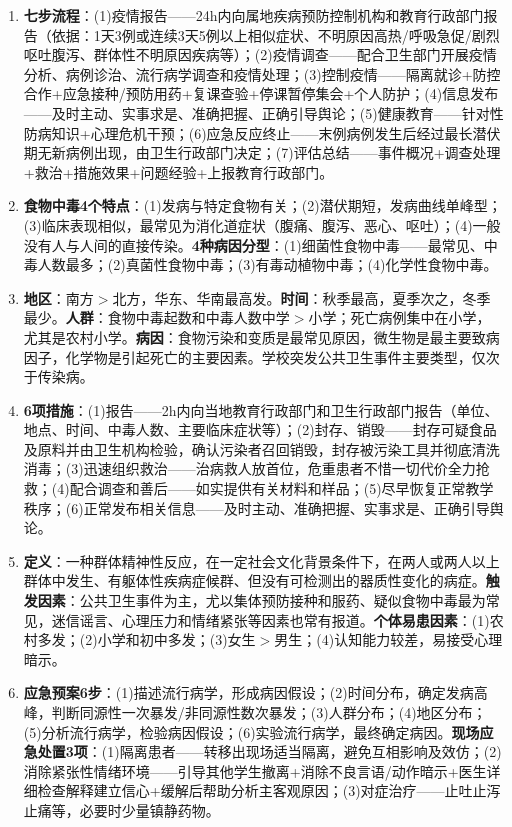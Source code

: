 \begin{enumerate}[leftmargin=*, itemsep=5pt]
    \item \textbf{七步流程}：(1)疫情报告——24h内向属地疾病预防控制机构和教育行政部门报告（依据：1天3例或连续3天5例以上相似症状、不明原因高热/呼吸急促/剧烈呕吐腹泻、群体性不明原因疾病等）；(2)疫情调查——配合卫生部门开展疫情分析、病例诊治、流行病学调查和疫情处理；(3)控制疫情——隔离就诊+防控合作+应急接种/预防用药+复课查验+停课暂停集会+个人防护；(4)信息发布——及时主动、实事求是、准确把握、正确引导舆论；(5)健康教育——针对性防病知识+心理危机干预；(6)应急反应终止——末例病例发生后经过最长潜伏期无新病例出现，由卫生行政部门决定；(7)评估总结——事件概况+调查处理+救治+措施效果+问题经验+上报教育行政部门。

    \item \textbf{食物中毒4个特点}：(1)发病与特定食物有关；(2)潜伏期短，发病曲线单峰型；(3)临床表现相似，最常见为消化道症状（腹痛、腹泻、恶心、呕吐）；(4)一般没有人与人间的直接传染。\textbf{4种病因分型}：(1)细菌性食物中毒——最常见、中毒人数最多；(2)真菌性食物中毒；(3)有毒动植物中毒；(4)化学性食物中毒。

    \item \textbf{地区}：南方$>$北方，华东、华南最高发。\textbf{时间}：秋季最高，夏季次之，冬季最少。\textbf{人群}：食物中毒起数和中毒人数中学$>$小学；死亡病例集中在小学，尤其是农村小学。\textbf{病因}：食物污染和变质是最常见原因，微生物是最主要致病因子，化学物是引起死亡的主要因素。学校突发公共卫生事件主要类型，仅次于传染病。

    \item \textbf{6项措施}：(1)报告——2h内向当地教育行政部门和卫生行政部门报告（单位、地点、时间、中毒人数、主要临床症状等）；(2)封存、销毁——封存可疑食品及原料并由卫生机构检验，确认污染者召回销毁，封存被污染工具并彻底清洗消毒；(3)迅速组织救治——治病救人放首位，危重患者不惜一切代价全力抢救；(4)配合调查和善后——如实提供有关材料和样品；(5)尽早恢复正常教学秩序；(6)正常发布相关信息——及时主动、准确把握、实事求是、正确引导舆论。

    \item \textbf{定义}：一种群体精神性反应，在一定社会文化背景条件下，在两人或两人以上群体中发生、有躯体性疾病症候群、但没有可检测出的器质性变化的病症。\textbf{触发因素}：公共卫生事件为主，尤以集体预防接种和服药、疑似食物中毒最为常见，迷信谣言、心理压力和情绪紧张等因素也常有报道。\textbf{个体易患因素}：(1)农村多发；(2)小学和初中多发；(3)女生$>$男生；(4)认知能力较差，易接受心理暗示。

    \item \textbf{应急预案6步}：(1)描述流行病学，形成病因假设；(2)时间分布，确定发病高峰，判断同源性一次暴发/非同源性数次暴发；(3)人群分布；(4)地区分布；(5)分析流行病学，检验病因假设；(6)实验流行病学，最终确定病因。\textbf{现场应急处置3项}：(1)隔离患者——转移出现场适当隔离，避免互相影响及效仿；(2)消除紧张性情绪环境——引导其他学生撤离+消除不良言语/动作暗示+医生详细检查解释建立信心+缓解后帮助分析主客观原因；(3)对症治疗——止吐止泻止痛等，必要时少量镇静药物。


\end{enumerate}
